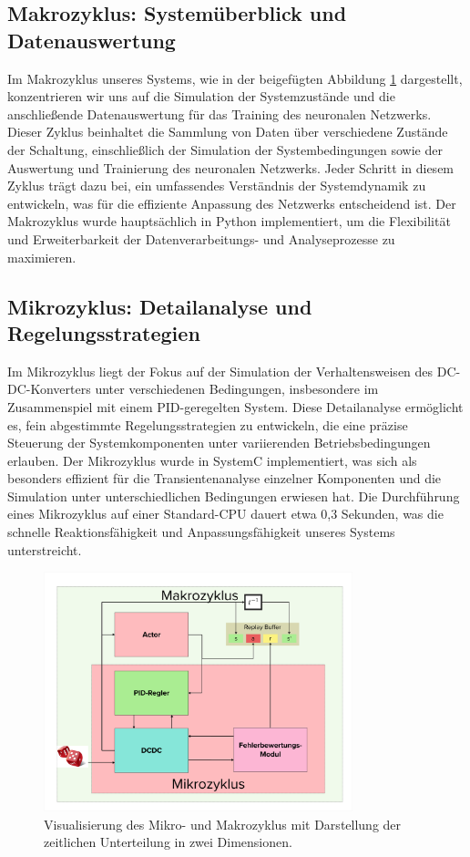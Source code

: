 
\subsection{Makrozyklus: Systemüberblick und Datenauswertung}
Im Makrozyklus unseres Systems, wie in der beigefügten Abbildung \ref{fig:makrozyklus} dargestellt, konzentrieren wir uns auf die Simulation der Systemzustände und die anschließende Datenauswertung für das Training des neuronalen Netzwerks. Dieser Zyklus beinhaltet die Sammlung von Daten über verschiedene Zustände der Schaltung, einschließlich der Simulation der Systembedingungen sowie der Auswertung und Trainierung des neuronalen Netzwerks. Jeder Schritt in diesem Zyklus trägt dazu bei, ein umfassendes Verständnis der Systemdynamik zu entwickeln, was für die effiziente Anpassung des Netzwerks entscheidend ist. Der Makrozyklus wurde hauptsächlich in Python implementiert, um die Flexibilität und Erweiterbarkeit der Datenverarbeitungs- und Analyseprozesse zu maximieren.

\subsection{Mikrozyklus: Detailanalyse und Regelungsstrategien}

Im Mikrozyklus liegt der Fokus auf der Simulation der Verhaltensweisen des DC-DC-Konverters unter verschiedenen Bedingungen, insbesondere im Zusammenspiel mit einem PID-geregelten System. Diese Detailanalyse ermöglicht es, fein abgestimmte Regelungsstrategien zu entwickeln, die eine präzise Steuerung der Systemkomponenten unter variierenden Betriebsbedingungen erlauben. Der Mikrozyklus wurde in SystemC implementiert, was sich als besonders effizient für die Transientenanalyse einzelner Komponenten und die Simulation unter unterschiedlichen Bedingungen erwiesen hat. Die Durchführung eines Mikrozyklus auf einer Standard-CPU dauert etwa 0,3 Sekunden, was die schnelle Reaktionsfähigkeit und Anpassungsfähigkeit unseres Systems unterstreicht.

\begin{figure}[htbp]
\centering
\includegraphics[width=0.8\textwidth]{3Experiment/2Experiment/0Zeitliche_Dimensio.png}
\caption{Visualisierung des Mikro- und Makrozyklus mit Darstellung der zeitlichen Unterteilung in zwei Dimensionen.}
\label{fig:makrozyklus}
\end{figure}

